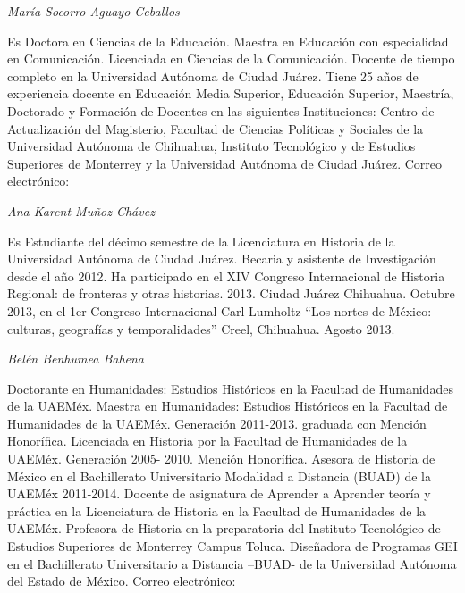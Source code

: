{ 
\textit{María Socorro Aguayo Ceballos}}

{ 
Es Doctora en Ciencias de la Educación. Maestra en Educación con
especialidad en Comunicación. Licenciada en Ciencias de la Comunicación.
Docente de tiempo completo en la Universidad Autónoma de Ciudad Juárez.
Tiene 25 años de experiencia docente en Educación Media Superior, Educación
Superior, Maestría, Doctorado  y Formación de Docentes en las siguientes
Instituciones: Centro de Actualización del Magisterio, Facultad de Ciencias
Políticas y Sociales de la Universidad Autónoma de Chihuahua, Instituto
Tecnológico y de Estudios Superiores de Monterrey y la Universidad Autónoma
de Ciudad Juárez. Correo electrónico:
\href{mailto:socorro_aguayo@yahoo.com.mx}{\textstyleInternetlink{\textcolor{blue}{socorro\_aguayo@yahoo.com.mx}}}}


\bigskip

{ 
\textit{Ana Karent Muñoz Chávez}}

{ 
Es Estudiante del décimo semestre de la Licenciatura en Historia de la
Universidad Autónoma de Ciudad Juárez. Becaria y asistente de Investigación
desde el año 2012. Ha participado en el XIV Congreso Internacional de
Historia Regional: de fronteras y otras historias. 2013. Ciudad Juárez
Chihuahua. Octubre 2013, en el 1er Congreso Internacional Carl Lumholtz
“Los nortes de México: culturas, geografías y temporalidades” Creel,
Chihuahua. Agosto 2013. }


\bigskip


\bigskip

{ 
\textit{Belén Benhumea Bahena}}

{ 
Doctorante en Humanidades: Estudios Históricos en la Facultad de Humanidades
de la UAEMéx.  Maestra en Humanidades: Estudios Históricos en la Facultad
de Humanidades de la UAEMéx. Generación 2011-2013. graduada con Mención
Honorífica. Licenciada en Historia por la Facultad de Humanidades de la
UAEMéx. Generación 2005- 2010. Mención Honorífica. Asesora de Historia de
México en el Bachillerato Universitario Modalidad a Distancia (BUAD)  de la
UAEMéx  2011-2014. Docente de asignatura de Aprender a Aprender teoría y
práctica en la Licenciatura de Historia en la Facultad de Humanidades de la
UAEMéx. Profesora de Historia en la preparatoria del Instituto Tecnológico
de Estudios Superiores de Monterrey Campus Toluca. Diseñadora de Programas
GEI en el Bachillerato Universitario a Distancia –BUAD- de la Universidad
Autónoma del Estado de México. Correo electrónico:
\href{mailto:beli_ordenyprogreso@yahoo.com.mx}{}}


